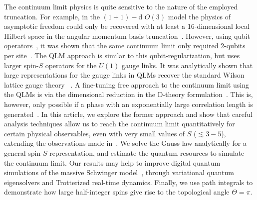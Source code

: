 \documentclass[aps,prl,reprint,twocolumn,superscriptaddress,floatfix,nofootinbib]{revtex4-1}
\begin{document}
	The continuum limit physics is quite sensitive to the nature of the employed truncation. 
	For example, in the $(1+1)-$d $O(3)$ model 
	the physics of asymptotic freedom could only be recovered with at least a 16-dimensional local Hilbert space in the angular momentum basis truncation~\cite{Bruckmann:2018usp}.
	However, using qubit operators~\cite{Singh:2019uwd}, it was shown that the same continuum limit only required 2-qubits per site~\cite{Bhattacharya:2020gpm}. The QLM approach is similar to this qubit-regularization, but uses larger spin-$S$ operators for the $U(1)$ gauge links. It was analytically shown that large representations for the gauge links in QLMs recover the standard Wilson lattice gauge theory ~\cite{Schlittgen:2000xg}. A fine-tuning free approach to the continuum limit using the QLMs is via the dimensional reduction in the D-theory formulation~\cite{Brower:2003vy}. This is, however, only possible if a phase with an exponentially large correlation length is generated~\cite{Beard:2004jr}. In this article, we explore the former approach and show that careful analysis techniques allow us to reach the continuum limit quantitatively for certain physical observables, even with very small values of $S$ ($\lesssim 3-5$), extending the observations made in~\cite{kuhn2014quantum,buyens2017finite}. We solve the Gauss law analytically for a general spin-$S$ representation, and estimate the quantum resources to simulate the continuum limit.
	Our results may help to improve digital quantum simulations of the massive Schwinger model~\cite{shaw2020quantum,chakraborty2020digital,honda2021digital}, through variational quantum eigensolvers and Trotterized real-time dynamics.
	Finally, we use path integrals to demonstrate how large half-integer spins give rise to the topological angle $\Theta=\pi$.
	
	
\end{document}
